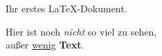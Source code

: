 \documentclass[a4paper,12pt]{article}
\begin{document}
\huge
Ihr erstes \LaTeX-Dokument.
\normalsize

Hier ist noch \textit{nicht} so viel zu sehen,\\
außer \underline{\small wenig} \textbf{Text}.
\end{document}
